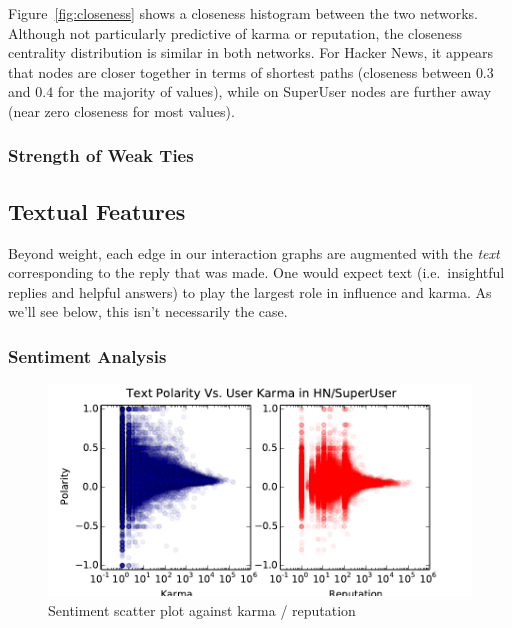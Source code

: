 \documentclass[11pt]{article}
\begin{document}
Figure~\ref{fig:closeness} shows a closeness histogram between the two networks.
Although not particularly predictive of karma or reputation, the closeness
centrality distribution is similar in both networks. For Hacker News, it appears
that nodes are closer together in terms of shortest paths (closeness between
$0.3$ and $0.4$ for the majority of values), while on SuperUser nodes are
further away (near zero closeness for most values).


\subsubsection{Strength of Weak Ties}


\subsection{Textual Features}
Beyond weight, each edge in our interaction graphs are augmented with the
\textit{text} corresponding to the reply that was made. One would expect 
text (i.e.\ insightful replies and helpful answers) to play the largest role 
in influence and karma. As we'll see below, this isn't necessarily the case.


\subsubsection{Sentiment Analysis}
\label{sec:sentiment}
\begin{figure}[h]
\centering
\includegraphics[width=\linewidth]{text_polarity}
\caption{Sentiment scatter plot against karma / reputation}
\label{fig:sentiment}
\end{figure}
\end{document}
